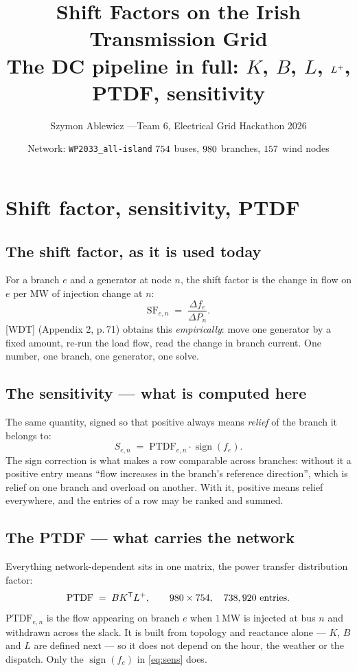 \documentclass[11pt,a4paper]{article}
\title{\textbf{Shift Factors on the Irish Transmission Grid}\\[2mm]
\large The DC pipeline in full: $K$, $B$, $L$, $\Lp$, PTDF, sensitivity}
\author{Szymon Ablewicz \quad---\quad Team 6, Electrical Grid Hackathon 2026}
\date{Network: \texttt{WP2033\_all-island} \quad
      $754$ buses, $980$ branches, $157$ wind nodes}
\newcommand{\T}{^{\mathsf{T}}}
\newcommand{\Lp}{L^{+}}
\begin{document}
\maketitle

\section{Shift factor, sensitivity, PTDF}

\subsection*{The shift factor, as it is used today}

For a branch $e$ and a generator at node $n$, the shift factor is the change in
flow on $e$ per MW of injection change at $n$:
\begin{equation}
  \text{SF}_{e,n} \;=\; \frac{\Delta f_e}{\Delta P_n}.
  \label{eq:sf}
\end{equation}
[WDT] (Appendix 2, p.\,71) obtains this \emph{empirically}: move one generator
by a fixed amount, re-run the load flow, read the change in branch current.
One number, one branch, one generator, one solve.

\subsection*{The sensitivity --- what is computed here}

The same quantity, signed so that positive always means \emph{relief} of the
branch it belongs to:
\begin{equation}
  S_{e,n} \;=\; \text{PTDF}_{e,n}\cdot\operatorname{sign}(f_e).
  \label{eq:sens}
\end{equation}
The sign correction is what makes a row comparable across branches: without it
a positive entry means ``flow increases in the branch's reference direction'',
which is relief on one branch and overload on another. With it, positive means
relief everywhere, and the entries of a row may be ranked and summed.

\subsection*{The PTDF --- what carries the network}

Everything network-dependent sits in one matrix, the power transfer
distribution factor:
\begin{equation}
  \text{PTDF} \;=\; B K\T \Lp,
  \qquad \gne \times \gnb, \quad \gnPtdfEntries \text{ entries}.
  \label{eq:ptdf}
\end{equation}
$\text{PTDF}_{e,n}$ is the flow appearing on branch $e$ when $1$\,MW is
injected at bus $n$ and withdrawn across the slack. It is built from topology
and reactance alone --- $K$, $B$ and $L$ are defined next --- so it does not
depend on the hour, the weather or the dispatch. Only the $\operatorname{sign}(f_e)$
in \eqref{eq:sens} does.
\end{document}
